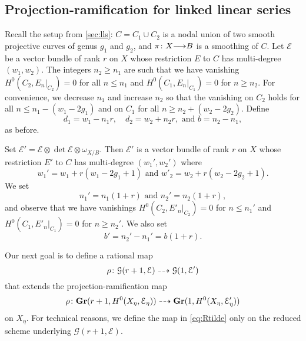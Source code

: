 \documentclass[11pt,reqno]{amsart}
\theoremstyle{plain}
\theoremstyle{definition}
\theoremstyle{remark}
\numberwithin{equation}{section}
\renewcommand{\to}{{\longrightarrow}}
\numberwithin{equation}{section}
\begin{document}
\subsection{Projection-ramification for linked linear series}
\label{sec:prlls}
Recall the setup from \autoref{sec:lls}: $C = C_1 \cup C_2$ is a nodal union of two smooth projective curves of genus $g_1$ and $g_2$, and $\pi \from X \to B$ is a smoothing of $C$.
Let $\mathcal E$ be a vector bundle of rank $r$ on $X$ whose restriction $E$ to $C$ has multi-degree $(w_1, w_2)$.
The integers $n_2 \geq n_1$ are such that we have vanishing $H^0(C_2, E_n|_{C_2}) = 0$ for all $n \leq n_1$ and $H^0(C_1, E_n|_{C_1}) = 0$ for $n \geq n_2$.
For convenience, we decrease $n_1$ and increase $n_2$ so that the vanishing on $C_2$ holds for all $n \leq n_1 - (w_1-2g_1)$ and on $C_1$ for all $n \geq n_2 + (w_2-2g_2)$.
Define
\[ d_1 = w_1 - n_1r, \quad d_2 = w_2 + n_2r,\text{ and } b = n_2 - n_1,\]
as before.

Set $\mathcal E' = \mathcal E \otimes \det \mathcal E \otimes \omega_{X/B}$.
Then $\mathcal E'$ is a vector bundle of rank $r$ on $X$ whose restriction $E'$ to $C$ has multi-degree $(w_1', w_2')$ where
\[ w_1' = w_1 + r(w_1-2g_1+1) \text{ and } w'_2 = w_2 + r(w_2-2g_2+1).\]
We set
\[ n_1' = n_1(1+r) \text{ and } n_2' = n_2(1+r),\]
and observe that we have vanishings $H^0(C_2, E'_{n}|_{C_2}) = 0$ for $n \leq n_1'$ and $H^0(C_1, E'_{n}|_{C_1}) = 0$ for $n \geq n_2'$.
We also set
\[ b' = n_2' - n_1' = b(1+r).\]

Our next goal is to define a rational map
\begin{equation}\label{eq:Rtilde}
  \rho {\colon} {\mathcal G}(r+1, \mathcal E) \dashrightarrow {\mathcal G}(1, \mathcal E')
\end{equation}
that extends the projection-ramification map
\[
  \rho {\colon} {\bf Gr}(r+1, H^0(X_\eta, \mathcal E_\eta)) \dashrightarrow {\bf Gr}(1, H^0(X_\eta, \mathcal E'_\eta))
\]
on $X_\eta$.
For technical reasons, we define the map in \eqref{eq:Rtilde} only on the reduced scheme underlying ${\mathcal G}(r+1, \mathcal E)$.
\end{document}
